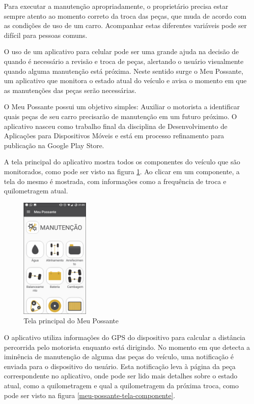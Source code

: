 Para executar a manutenção apropriadamente, o proprietário precisa estar
sempre atento ao momento correto da troca das peças, que muda de acordo
com as condições de uso de um carro. Acompanhar estas diferentes variáveis pode
ser difícil para pessoas comuns.

O uso de um aplicativo para celular pode ser uma grande ajuda na decisão de quando
é necessário a revisão e troca de peças, alertando o usuário visualmente quando alguma
manutenção está próxima. Neste sentido surge o Meu Possante, um aplicativo que monitora
o estado atual do veículo e avisa o momento em que as manutenções das peças serão
necessárias.

O Meu Possante possui um objetivo simples: Auxiliar o motorista a identificar quais
peças de seu carro precisarão de manutenção em um futuro próximo. O aplicativo nasceu
como trabalho final da disciplina de Desenvolvimento de Aplicações para Dispositivos
Móveis e está em processo refinamento para publicação na Google Play Store.

A tela principal do aplicativo mostra todos os componentes do veículo que são monitorados,
como pode ser visto na figura \ref{meu-possante-tela-principal}. Ao clicar em um componente,
a tela do mesmo é mostrada, com informações como a frequência de troca e quilometragem
atual.

\begin{figure}[h]
\centering
\includegraphics[width=0.3\textwidth]{images/meu-possante-tela-principal.png}
\caption{Tela principal do Meu Possante}
\label{meu-possante-tela-principal}
\end{figure}

O aplicativo utiliza informações do GPS do dispositivo para calcular a distância percorrida
pelo motorista enquanto está dirigindo. No momento em que detecta a iminência de manutenção
de alguma das peças do veículo, uma notificação é enviada para o dispositivo do usuário.
Esta notificação leva à página da peça correspondente no aplicativo, onde pode ser lido
mais detalhes sobre o estado atual, como a quilometragem e qual a quilometragem da
próxima troca, como pode ser visto na figura \ref{meu-possante-tela-componente}.

